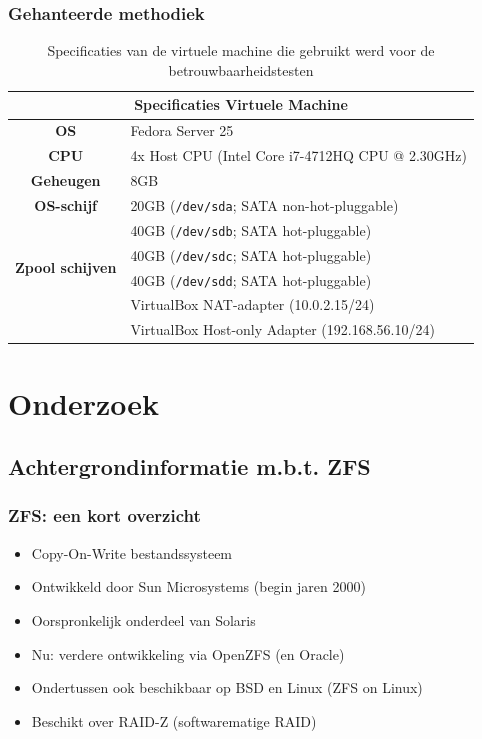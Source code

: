 \documentclass{beamer}
\begin{document}
\begin{frame}
  \frametitle{Gehanteerde methodiek}
  \begin{table}[h]
    \centering
    \begin{tabular}{c l}
      \toprule
      \multicolumn{2}{c}{\textbf{Specificaties Virtuele Machine}} \\
      \hline
      \textbf{OS} & Fedora Server 25 \\
      \hline
      \textbf{CPU} & 4x Host CPU (Intel Core i7-4712HQ CPU @ 2.30GHz) \\
      \hline
      \textbf{Geheugen} & 8GB \\
      \hline
      \textbf{OS-schijf} & 20GB (\texttt{/dev/sda}; SATA non-hot-pluggable) \\
      \hline
      \multirow{4}{*}{\textbf{Zpool schijven}} & 40GB (\texttt{/dev/sdb}; SATA hot-pluggable) \\
        & 40GB (\texttt{/dev/sdc}; SATA hot-pluggable) \\
        & 40GB (\texttt{/dev/sdd}; SATA hot-pluggable) \\
      \hline
      \multirow{2}{*}{\textbf{NIC's}} & VirtualBox NAT-adapter (10.0.2.15/24) \\
        & VirtualBox Host-only Adapter (192.168.56.10/24) \\
      \bottomrule
    \end{tabular}
    \caption{Specificaties van de virtuele machine die gebruikt werd voor de betrouwbaarheidstesten}
    \label{tab:specs_vm}
  \end{table}
\end{frame}

\section{Onderzoek}

\subsection{Achtergrondinformatie m.b.t. ZFS}


\begin{frame}
\frametitle{ZFS: een kort overzicht}
\begin{itemize}
  \item Copy-On-Write bestandssysteem
  \item Ontwikkeld door Sun Microsystems (begin jaren 2000) 
  \item Oorspronkelijk onderdeel van Solaris
  \item Nu: verdere ontwikkeling via OpenZFS (en Oracle)
  \item Ondertussen ook beschikbaar op BSD en Linux (ZFS on Linux)
  \item{Beschikt over RAID-Z (softwarematige RAID)}
\end{itemize}
\end{frame}
\end{document}
